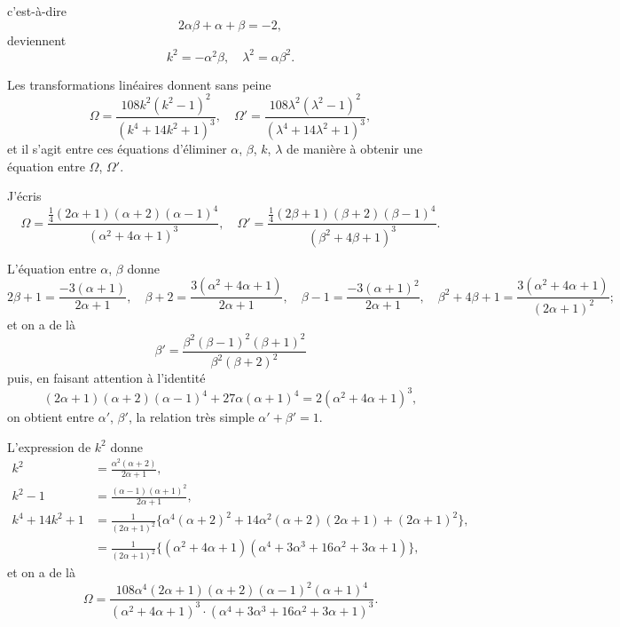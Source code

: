 \documentclass[11pt,a4paper]{article}
\theoremstyle{plain}
\theoremstyle{definition}
\begin{document}
\clearpage

c'est-\`a-dire
\[
2\alpha\beta + \alpha + \beta = -2,
\]
deviennent
\[
k^2 = -\alpha^2\beta,\quad \lambda^2 = \alpha\beta^2.
\]

Les transformations lin\'eaires donnent sans peine
\[
\Omega = \frac{108k^2(k^2 - 1)^2}{(k^4 + 14k^2 + 1)^3},
\quad
\Omega' = \frac{108\lambda^2(\lambda^2 - 1)^2}{(\lambda^4 + 14\lambda^2 + 1)^3},
\]
et il s'agit entre ces \'equations d'\'eliminer $\alpha$, $\beta$, $k$, $\lambda$ de mani\`ere \`a obtenir une \'equation
entre $\Omega$, $\Omega'$.

J'\'ecris
\[
\Omega = \frac{\tfrac{1}{4}(2\alpha + 1)(\alpha + 2)(\alpha - 1)^4}{(\alpha^2 + 4\alpha + 1)^3},
\quad
\Omega' = \frac{\tfrac{1}{4}(2\beta + 1)(\beta + 2)(\beta - 1)^4}{(\beta^2 + 4\beta + 1)^3}.
\]

L'\'equation entre $\alpha$, $\beta$ donne
\[
2\beta + 1 = \frac{-3(\alpha + 1)}{2\alpha + 1},\quad
\beta + 2 = \frac{3(\alpha^2 + 4\alpha + 1)}{2\alpha + 1},\quad
\beta - 1 = \frac{-3(\alpha + 1)^2}{2\alpha + 1},
\quad
\beta^2 + 4\beta + 1 = \frac{3(\alpha^2 + 4\alpha + 1)}{(2\alpha + 1)^2};
\]
et on a de l\`a
\[
\beta' = \frac{\beta^2(\beta - 1)^2(\beta + 1)^2}{\beta^2(\beta + 2)^2}
\]
puis, en faisant attention \`a l'identit\'e
\[
(2\alpha + 1)(\alpha + 2)(\alpha - 1)^4 + 27\alpha(\alpha + 1)^4 = 2(\alpha^2 + 4\alpha + 1)^3,
\]
on obtient entre $\alpha'$, $\beta'$, la relation tr\`es simple $\alpha' + \beta' = 1$.

L'expression de $k^2$ donne
\begin{align*}
k^2 &= \frac{\alpha^2(\alpha + 2)}{2\alpha + 1}, \\
k^2 - 1 &= \frac{(\alpha - 1)(\alpha + 1)^2}{2\alpha + 1}, \\
k^4 + 14k^2 + 1 &= \frac{1}{(2\alpha + 1)^2}\bigl\{\alpha^4(\alpha + 2)^2 + 14\alpha^2(\alpha + 2)(2\alpha + 1) + (2\alpha + 1)^2\bigr\}, \\
&= \frac{1}{(2\alpha + 1)^2}\bigl\{(\alpha^2 + 4\alpha + 1)(\alpha^4 + 3\alpha^3 + 16\alpha^2 + 3\alpha + 1)\bigr\},
\end{align*}
et on a de l\`a
\[
\Omega = \frac{108\alpha^4(2\alpha + 1)(\alpha + 2)(\alpha - 1)^2(\alpha + 1)^4}{(\alpha^2 + 4\alpha + 1)^3 \cdot (\alpha^4 + 3\alpha^3 + 16\alpha^2 + 3\alpha + 1)^3}.
\]

\clearpage
\end{document}
